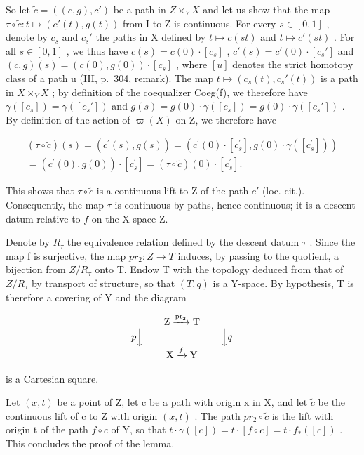 So let \(\widetilde{c} = ((c,g),c')\) be a path in \(Z\times_{Y}X\) and let us show that the map \(\tau \circ \widetilde{c}\colon t\mapsto (c'(t),g(t))\) from I to Z is continuous. For every \(s\in [0,1]\) , denote by \(c_s\) and \(c_s'\) the paths in X defined by \(t\mapsto c(st)\) and \(t\mapsto c'(st)\) . For all \(s\in [0,1]\) , we thus have \(c(s) = c(0)\cdot [c_s]\) , \(c'(s) = c'(0)\cdot [c_s']\) and \((c,g)(s) = (c(0),g(0))\cdot [c_s]\) , where \([u]\) denotes the strict homotopy class of a path u (III, p.~304, remark). The map \(t\mapsto (c_s(t),c_s'(t))\) is a path in \(X\times_{Y}X\) ; by definition of the coequalizer Coeg(f), we therefore have \(\gamma ([c_s]) = \gamma ([c_s'])\) and \(g(s) = g(0)\cdot \gamma ([c_s]) = g(0)\cdot \gamma ([c_s'])\) . By definition of the action of \(\varpi (X)\) on Z, we therefore have

\[
\begin{array}{r} (\tau \circ \widetilde {c}) (s) = (c ^ {\prime} (s), g (s)) = (c ^ {\prime} (0) \cdot [ c _ {s} ^ {\prime} ], g (0) \cdot \gamma ([ c _ {s} ^ {\prime} ])) \\ = (c ^ {\prime} (0), g (0)) \cdot [ c _ {s} ^ {\prime} ] = (\tau \circ \widetilde {c}) (0) \cdot [ c _ {s} ^ {\prime} ]. \end{array}
\]

This shows that \(\tau \circ \widetilde{c}\) is a continuous lift to Z of the path \(c'\) (loc. cit.). Consequently, the map \(\tau\) is continuous by paths, hence continuous; it is a descent datum relative to \(f\) on the X-space Z.

Denote by \(R_{\tau}\) the equivalence relation defined by the descent datum \(\tau\) . Since the map f is surjective, the map \(pr_{2}: Z \to T\) induces, by passing to the quotient, a bijection from \(Z/R_{\tau}\) onto T. Endow T with the topology deduced from that of \(Z/R_{\tau}\) by transport of structure, so that \((T,q)\) is a Y-space. By hypothesis, T is therefore a covering of Y and the diagram

\[
\begin{array}{c} \mathrm{Z} \xrightarrow {\mathrm{pr} _ {2}} \mathrm{T} \\ p \Big \downarrow \qquad \qquad \qquad \qquad \Big \downarrow q \\ \mathrm{X} \xrightarrow {f} \mathrm{Y} \end{array}
\]

is a Cartesian square.

Let \((x,t)\) be a point of Z, let c be a path with origin x in X, and let \(\widetilde{c}\) be the continuous lift of c to Z with origin \((x,t)\) . The path \(pr_{2} \circ \widetilde{c}\) is the lift with origin t of the path \(f \circ c\) of Y, so that \(t \cdot \gamma([c]) = t \cdot [f \circ c] = t \cdot f_{*}([c])\) . This concludes the proof of the lemma.


